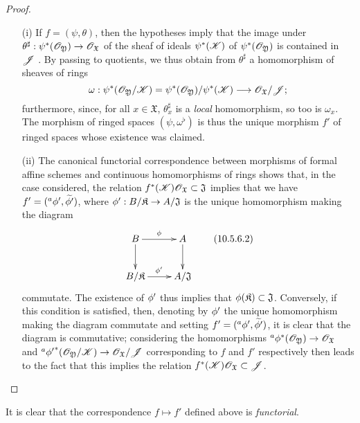 \begin{proof}
\label{proof-1.10.5.6}
\medskip\noindent
\begin{enumerate}
  \item[\rm{(i)}] If $f=(\psi,\theta)$, then the hypotheses imply that the image under $\theta^\sharp:\psi^*(\sh{O}_\mathfrak{Y})\to\sh{O}_\mathfrak{X}$ of the sheaf of ideals $\psi^*(\mathscr{K})$ of $\psi^*(\mathscr{O}_\mathfrak{Y})$ is contained in $\mathscr{J}$ .
    By passing to quotients, we thus obtain from $\theta^\sharp$ a homomorphism of sheaves of rings
    \[
      \omega:\psi^*(\sh{O}_\mathfrak{Y}/\sh{K})=\psi^*(\sh{O}_\mathfrak{Y})/\psi^*(\sh{K})\to\sh{O}_\mathfrak{X}/\sh{J};
    \]
    furthermore, since, for all $x\in\mathfrak{X}$, $\theta_x^\sharp$ is a \emph{local} homomorphism, so too is $\omega_x$.
    The morphism of ringed spaces $(\psi,\omega^\flat)$ is thus  the unique morphism $f'$ of ringed spaces whose existence was claimed.
  \item[\rm{(ii)}] The canonical functorial correspondence between morphisms of formal affine schemes and continuous homomorphisms of rings  shows that, in the case considered, the relation $f^*(\mathscr{K})\mathscr{O}_\mathfrak{X}\subset\mathfrak{J}$ implies that we have $f'=({}^a\phi',\widetilde{\phi'})$, where $\vphi':B/\mathfrak{K}\to A/\mathfrak{J}$ is the unique homomorphism making the diagram
    \[
    \label{1.10.5.6.2}
      \xymatrix{
        B\ar[r]^\vphi\ar[d] &
        A\ar[d]\\
        B/\mathfrak{K}\ar[r]^{\vphi'} &
        A/\mathfrak{J}
      }
      \tag{10.5.6.2}
    \]
    commutate.
    The existence of $\phi'$ thus implies that $\phi(\mathfrak{K})\subset\mathfrak{J}$.
    Conversely, if this condition is satisfied, then, denoting by $\phi'$ the unique homomorphism making the diagram  commutate and setting $f'=({}^a\phi',\widetilde{\phi'})$, it is clear that the diagram  is commutative; considering the homomorphisms ${}^a\vphi^*(\sh{O}_\mathfrak{Y})\to\sh{O}_\mathfrak{X}$ and ${}^a{\vphi'}^*(\sh{O}_\mathfrak{Y}/\sh{K})\to\sh{O}_\mathfrak{X}/\sh{J}$ corresponding to $f$ and $f'$ respectively then leads to the fact that this implies the relation $f^*(\mathscr{K})\mathscr{O}_\mathfrak{X}\subset\mathscr{J}$.
\end{enumerate}
\end{proof}

It is clear that the correspondence $f\mapsto f'$ defined above is \emph{functorial}.

